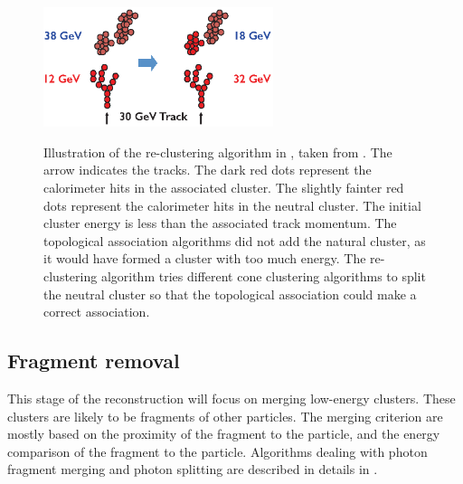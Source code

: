 \begin{figure}[tbph]
\centering
{\includegraphics[width=0.6\textwidth]{pandora/recluster}}%
\caption[Illustration of the re-clustering algorithm in \pandora]
{Illustration of the re-clustering algorithm in \pandora, taken from \cite{Marshall:pandoraLC}. The arrow indicates the tracks. The dark red dots represent the calorimeter hits in the associated cluster. The  slightly fainter red  dots represent the calorimeter hits in the neutral cluster. The initial cluster energy is less than the associated track momentum. The topological association algorithms did not add the natural cluster, as it would have formed a cluster with too much energy. The re-clustering algorithm tries different cone clustering algorithms to split the neutral cluster so that the topological association could make a correct association.}
\label{fig:pandoraRecluster}
\end{figure}

\subsection{Fragment removal}
\label{sec:pandoraFragmentRemoval}

This stage of the \pandora reconstruction will focus on merging low-energy clusters. These clusters are likely to be fragments of other particles. The merging criterion are mostly based on the proximity of the fragment to the particle, and the energy comparison of the fragment to the particle. Algorithms dealing with photon fragment merging and photon splitting are described in details in .

